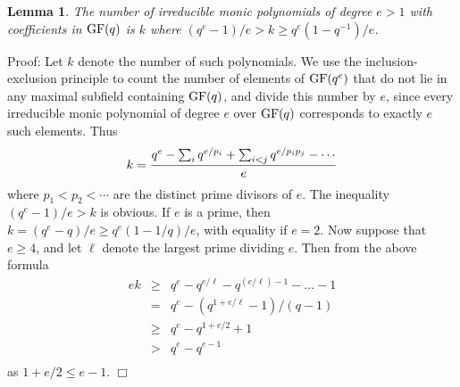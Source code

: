 \documentclass[12pt]{article}
\newtheorem{lemma}[definition]{Lemma}
\newenvironment{proof}{\normalsize {\sc Proof}:}{{\hfill $\Box$ \\}}
\def\GF{{\rm GF}}
\begin{document}
\begin{lemma}\label{monic} 
The number of irreducible monic polynomials of degree
$e>1$ with coefficients in $\GF(q)$ is $k$ where
$(q^e-1)/e>k\ge q^e(1-q^{-1})/e$.
\end{lemma}
\begin{proof}
Let $k$ denote the number of such polynomials.
We use the inclusion-exclusion principle to count the
number of elements of $\GF(q^e)$ that do not lie in any  maximal
subfield containing $\GF(q)$, and divide this number by $e$, since
every irreducible monic polynomial of degree $e$ over $\GF(q)$ corresponds
to exactly $e$ such elements.  Thus 
$$k = {q^e-\sum_iq^{e/p_i}+\sum_{i<j}q^{e/p_ip_j}-\cdots\over e}$$ 
where $p_1<p_2<\cdots$ are the distinct prime divisors of $e$. 
The inequality $(q^e-1)/e >k$ is obvious.  If $e$ is a prime,
then $k=(q^e-q)/e\ge q^e(1-1/q)/e$, with equality if $e=2$.
Now suppose that $e\ge4$, and let $\ell$ denote the largest prime
dividing $e$.  Then from the above formula 
\begin{eqnarray*}
ek & \ge & q^e-q^{e/\ell}-q^{(e/\ell)-1}-\ldots -1 \\
   & = &  q^e - (q^{1+e/\ell}-1)/(q-1)\\
   & \ge & q^e - q^{1+e/2}+1 \\
   & > & q^e - q^{e-1} \\
\end{eqnarray*}
as $1+e/2\le e-1$.
\end{proof}
\end{document}

